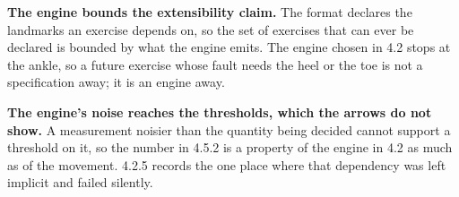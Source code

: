 \textbf{The engine bounds the extensibility claim.} The format declares the landmarks an exercise depends on, so the set of exercises that can ever be declared is bounded by what the engine emits. The engine chosen in 4.2 stops at the ankle, so a future exercise whose fault needs the heel or the toe is not a specification away; it is an engine away.

\textbf{The engine's noise reaches the thresholds, which the arrows do not show.} A measurement noisier than the quantity being decided cannot support a threshold on it, so the number in 4.5.2 is a property of the engine in 4.2 as much as of the movement. 4.2.5 records the one place where that dependency was left implicit and failed silently.
